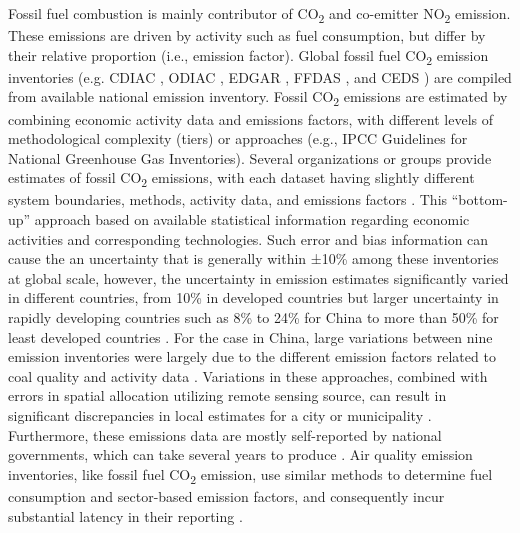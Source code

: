 Fossil fuel combustion is mainly contributor of CO\textsubscript{2} and co-emitter NO\textsubscript{2} emission. These emissions are driven by activity such as fuel consumption, but differ by their relative proportion (i.e., emission factor)\citep{miyazaki2023predictability}. Global fossil fuel CO\textsubscript{2} emission inventories (e.g. CDIAC \citep{andres2012synthesis}, ODIAC \citep{oda2011very, oda2018open}, EDGAR \citep{crippa2020high}, FFDAS \citep{asefi2014multiyear}, and CEDS \citep{hoesly2018historical}) are compiled from available national emission inventory. Fossil CO\textsubscript{2} emissions are estimated by combining economic activity data and emissions factors, with different levels of methodological complexity (tiers) or approaches (e.g., IPCC Guidelines for National Greenhouse Gas Inventories). Several organizations or groups provide estimates of fossil CO\textsubscript{2} emissions, with each dataset having slightly different system boundaries, methods, activity data, and emissions factors \citep{andrew2020comparison}. This “bottom-up” approach based on available statistical information regarding economic activities and corresponding technologies. Such error and bias information can cause the an uncertainty that is generally within ±10\% among these inventories at global scale, however, the uncertainty in emission estimates significantly varied in different countries, from 10\% in developed countries \citep{essd-11-1783-2019} but larger uncertainty in rapidly developing countries such as 8\% to 24\% for China \citep{han2020evaluating, marland2008uncertainties} to more than 50\% for least developed countries \citep{andres2016gridded, essd-11-1783-2019, oda2018open}. For the case in China, large variations between nine emission inventories were largely due to the different emission factors related to coal quality and activity data \citep{han2020evaluating,miyazaki2023predictability}. Variations in these approaches, combined with errors in spatial allocation utilizing remote sensing source, can result in significant discrepancies in local estimates for a city or municipality \citep{oda2019errors, hutchins2017comparison}. Furthermore, these emissions data are mostly self-reported by national governments, which can take several years to produce \citep{marland2008uncertainties}. Air quality emission inventories, like fossil fuel CO\textsubscript{2} emission, use similar methods to determine fuel consumption and sector-based emission factors, and consequently incur substantial latency in their reporting \citep{miyazaki2023predictability}.\par

